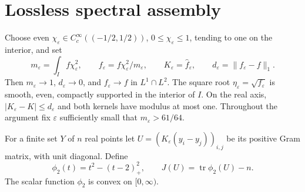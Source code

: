 \documentclass[11pt,a4paper]{article}
\theoremstyle{remark}
\DeclareMathOperator{\tr}{tr}
\begin{document}
\section{Lossless spectral assembly}

Choose even $\chi_\varepsilon\in C_c^\infty((-1/2,1/2))$,
$0\le\chi_\varepsilon\le1$, tending to one on the interior, and set
\[
 m_\varepsilon=\int_I f\chi_\varepsilon^2,\qquad
 f_\varepsilon=f\chi_\varepsilon^2/m_\varepsilon,\qquad
 K_\varepsilon=\widehat f_\varepsilon,\qquad
 d_\varepsilon=\|f_\varepsilon-f\|_1.
\]
Then $m_\varepsilon\to1$, $d_\varepsilon\to0$, and
$f_\varepsilon\to f$ in $L^1\cap L^2$.
The square root $\eta_\varepsilon=\sqrt{f_\varepsilon}$ is
smooth, even, compactly supported in the interior of $I$.
On the real axis, $|K_\varepsilon-K|\le d_\varepsilon$
and both kernels have modulus at most one.
Throughout the argument fix $\varepsilon$ sufficiently small that
$m_\varepsilon>61/64$.

For a finite set $Y$ of $n$ real points let
$U=(K_\varepsilon(y_i-y_j))_{i,j}$ be its positive Gram matrix,
with unit diagonal. Define
\[
 \phi_2(t)=t^2-(t-2)_+^2,\qquad
 J(U)=\tr\phi_2(U)-n .
\]
The scalar function $\phi_2$ is convex on $[0,\infty)$.
\end{document}
